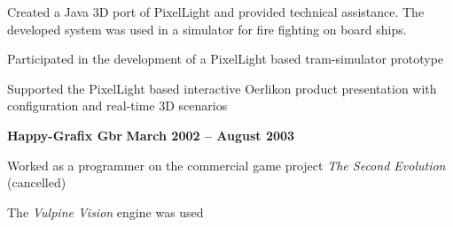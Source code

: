 \documentclass[margin,line]{Ofenberg_Resume}
\begin{document}
\begin{resume}
\begin{list2}
		\item Created a Java 3D port of PixelLight and provided technical assistance. The developed system was used in a simulator for fire fighting on board ships.
		\item Participated in the development of a PixelLight based tram-simulator prototype
		\item Supported the PixelLight based interactive Oerlikon product presentation with configuration and real-time 3D scenarios
	\end{list2}\vspace{-1.5mm}
	\textbf{Happy-Grafix Gbr} \hfill \textbf{March 2002 -- August 2003}\vspace{-3mm}\\\vspace{-1mm}%
	\begin{list2}
		\item Worked as a programmer on the commercial game project \emph{The Second Evolution} (cancelled)
		\item The \emph{Vulpine Vision} engine was used
	\end{list2}\vspace{-1.5mm}



\end{resume}
\end{document}
